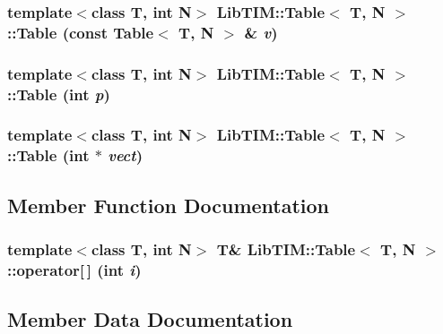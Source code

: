 \subsubsection{\setlength{\rightskip}{0pt plus 5cm}template$<$class T, int N$>$ {\bf Lib\-TIM::Table}$<$ T, N $>$::{\bf Table} (const {\bf Table}$<$ T, N $>$ \& {\em v})\hspace{0.3cm}{\tt  [inline]}}\label{structLibTIM_1_1Table_a1}


\subsubsection{\setlength{\rightskip}{0pt plus 5cm}template$<$class T, int N$>$ {\bf Lib\-TIM::Table}$<$ T, N $>$::{\bf Table} (int {\em p})\hspace{0.3cm}{\tt  [inline]}}\label{structLibTIM_1_1Table_a2}


\subsubsection{\setlength{\rightskip}{0pt plus 5cm}template$<$class T, int N$>$ {\bf Lib\-TIM::Table}$<$ T, N $>$::{\bf Table} (int $\ast$ {\em vect})\hspace{0.3cm}{\tt  [inline]}}\label{structLibTIM_1_1Table_a3}




\subsection{Member Function Documentation}
\subsubsection{\setlength{\rightskip}{0pt plus 5cm}template$<$class T, int N$>$ T\& {\bf Lib\-TIM::Table}$<$ T, N $>$::operator[$\,$] (int {\em i})\hspace{0.3cm}{\tt  [inline]}}\label{structLibTIM_1_1Table_a4}




\subsection{Member Data Documentation}
